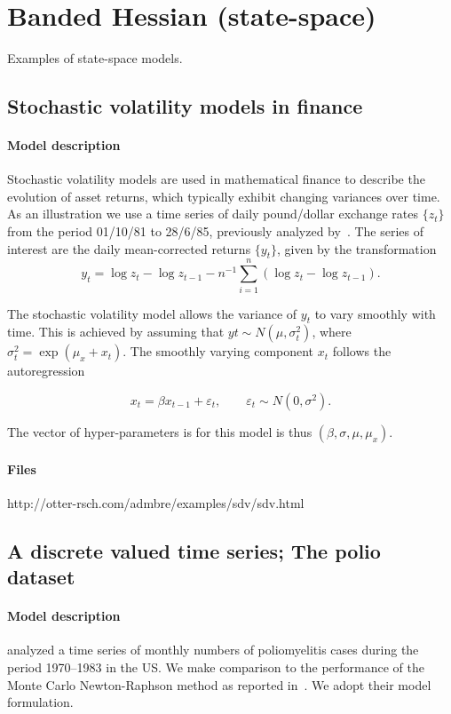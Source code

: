 \documentclass[12pt,letter,reqno]{book}
\begin{document}
\newpage

\section{Banded Hessian (state-space)}
Examples of state-space models.

\subsection{Stochastic volatility models in finance}

\paragraph{Model description}
Stochastic volatility models are used in mathematical finance to
describe the evolution of asset returns, which typically exhibit changing variances over
time. As an illustration we use a time series of daily pound/dollar exchange rates $\{z_t\}$
from the period 01/10/81 to 28/6/85, previously analyzed by~.
The series of interest are the daily mean-corrected returns $\{y_t\}$, given by the
transformation
\[
  y_t = \log z_t - \log z_{t-1} - n^{-1}\sum_{i=1}^n(\log z_t-\log z_{t-1}).
\]

The stochastic volatility model allows the variance of $y_t$ to vary smoothly with time. This
is achieved by assuming that $yt\sim N(\mu,\sigma_t^2)$, where $\sigma_t^2=\exp(\mu_x+x_t)$. The smoothly
varying component $x_t$ follows the autoregression

\[
  x_t = \beta x_{t-1} + \varepsilon_t, \qquad \varepsilon_t \sim N(0,\sigma^2).
\]

The vector of hyper-parameters is for this model is thus $(\beta,\sigma,\mu,\mu_x)$.

\paragraph{Files} http://otter-rsch.com/admbre/examples/sdv/sdv.html

\newpage

\subsection{A discrete valued time series; The polio dataset}
\label{sec:sdv_example}

\paragraph{Model description}
 analyzed a time series of monthly numbers of poliomyelitis cases
during the period 1970--1983 in the US. We make comparison to the performance of
the Monte Carlo Newton-Raphson method as reported in~. We
adopt their model formulation.
\end{document}
